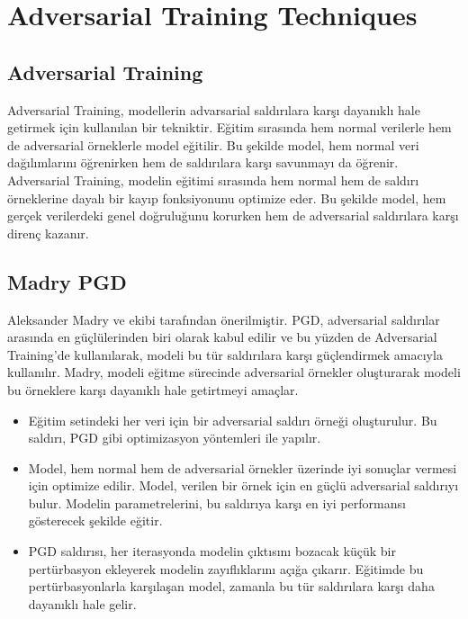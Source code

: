 \section{Adversarial Training Techniques}

\subsection{Adversarial Training}

Adversarial Training, modellerin advarsarial saldırılara karşı dayanıklı hale getirmek için kullanılan bir tekniktir. Eğitim sırasında hem normal verilerle hem de adversarial örneklerle model eğitilir. Bu şekilde model, hem normal veri dağılımlarını öğrenirken hem de saldırılara karşı savunmayı da öğrenir. Adversarial Training, modelin eğitimi sırasında hem normal hem de saldırı örneklerine dayalı bir kayıp fonksiyonunu optimize eder. Bu şekilde model, hem gerçek verilerdeki genel doğruluğunu korurken hem de adversarial saldırılara karşı direnç kazanır.

\newpage

\subsection{Madry PGD}

Aleksander Madry ve ekibi tarafından önerilmiştir. PGD, adversarial saldırılar arasında en güçlülerinden biri olarak kabul edilir ve bu yüzden de Adversarial Training'de kullanılarak, modeli bu tür saldırılara karşı güçlendirmek amacıyla kullanılır. Madry, modeli eğitme sürecinde adversarial örnekler oluşturarak modeli bu örneklere karşı dayanıklı hale getirtmeyi amaçlar. 

\begin{itemize}
    \item Eğitim setindeki her veri için bir adversarial saldırı örneği oluşturulur. Bu saldırı, PGD gibi optimizasyon yöntemleri ile yapılır.
    \item Model, hem normal hem de adversarial örnekler üzerinde iyi sonuçlar vermesi için optimize edilir. Model, verilen bir örnek için en güçlü adversarial saldırıyı bulur. Modelin parametrelerini, bu saldırıya karşı en iyi performansı gösterecek şekilde eğitir.
    \item PGD saldırısı, her iterasyonda modelin çıktısını bozacak küçük bir pertürbasyon ekleyerek modelin zayıflıklarını açığa çıkarır. Eğitimde bu pertürbasyonlarla karşılaşan model, zamanla bu tür saldırılara karşı daha dayanıklı hale gelir.
\end{itemize}

